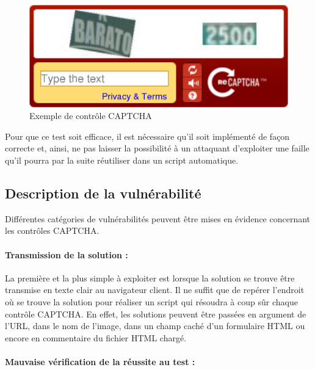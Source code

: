 \begin{figure}[!h]
\begin{center}

\includegraphics[scale=0.3]{images/captcha1.png}

\caption{Exemple de contrôle CAPTCHA}
\label{captcha1}
\end{center}
\end{figure}

Pour que ce test soit efficace, il est nécessaire qu'il soit implémenté de façon correcte et, ainsi, ne pas laisser la possibilité à un attaquant d'exploiter une faille qu'il pourra par la suite réutiliser dans un script automatique.
 

\subsection{Description de la vulnérabilité}

Différentes catégories de vulnérabilités peuvent être mises en évidence concernant les contrôles CAPTCHA.

\paragraph{Transmission de la solution :}

La première et la plus simple à exploiter est lorsque la solution se trouve être transmise en texte clair au navigateur client. Il ne suffit que de repérer l'endroit où se trouve la solution pour réaliser un script qui résoudra à coup sûr chaque contrôle CAPTCHA. En effet, les solutions peuvent être passées en argument de l'URL, dans le nom de l'image, dans un champ caché d'un formulaire HTML ou encore en commentaire du fichier HTML chargé. 

\paragraph{Mauvaise vérification de la réussite au test :}

